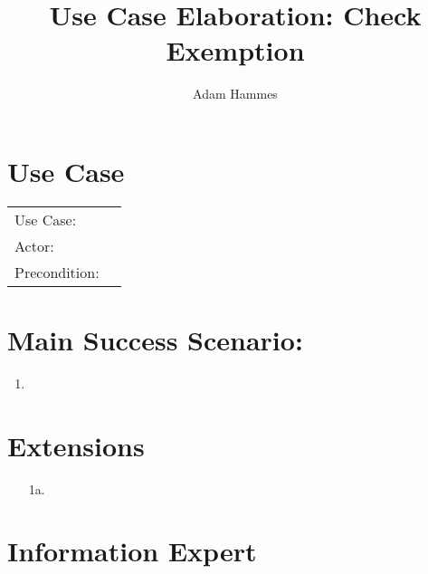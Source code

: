 \documentclass{article}
\title{Use Case Elaboration: Check Exemption}
\author{Adam Hammes}
\begin{document}
\maketitle

\section*{Use Case}
\begin{tabular}{l l}
  Use Case:     & \\
  Actor:        & \\
  Precondition: & \\
\end{tabular}

\section*{Main Success Scenario:}
\begin{enumerate}
  \item 
\end{enumerate}

\section*{Extensions}
\begin{itemize}
  \item [1a.]

\end{itemize}

\section*{Information Expert}
\end{document}
